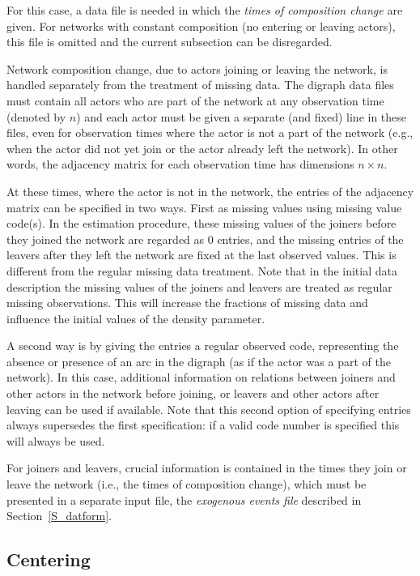 \documentclass[a4paper,fleqn]{article}
\newcommand{\+}{\, + \,}
\begin{document}
{For this case, a data file is needed in which the
\emph{times of composition change} are given. For networks with
constant composition (no entering or leaving actors), this file is
omitted and the current subsection can be disregarded.

Network composition change, due to actors joining or leaving the
network, is handled separately from the treatment of missing data.
The digraph data files must contain all actors who are part of the
network at any observation time (denoted by $n$) and each actor
must be given a separate (and fixed) line in these files, even for
observation times where the actor is not a part of the network
(e.g., when the actor did not yet join or the actor already left
the network). In other words, the adjacency matrix for each
observation time has dimensions $n \times n$.

\begin{screen}
\newpage
\end{screen}
At these times, where the actor is not in the network, the entries
of the adjacency matrix can be specified in two ways. First as
missing values using missing value code(s). In the estimation
procedure, these missing values of the joiners before they joined
the network are regarded as 0 entries, and the missing entries of
the leavers after they left the network are fixed at the last
observed values. This is different from the regular missing data
treatment. Note that in the initial data description the missing
values of the joiners and leavers are treated as regular missing
observations. This will increase the fractions of missing data and
influence the initial values of the density parameter.

A second way is by giving the entries a regular observed code,
representing the absence or presence of an arc in the digraph (as
if the actor was a part of the network). In this case, additional
information on relations between joiners and other actors in the
network before joining, or leavers and other actors after leaving
can be used if available. Note that this second option of
specifying entries always supersedes the first specification: if a
valid code number is specified this will always be used.

For joiners and leavers, crucial information is contained in the
times they join or leave the network (i.e., the times of
composition change), which must be presented in a separate input
file, the \emph{exogenous events file}
described in Section~\ref{S_datform}.


\subsection{Centering}

}
\end{document}
